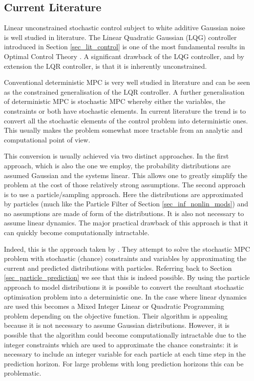\subsection{Current Literature}
Linear unconstrained stochastic control subject to white additive Gaussian noise is well studied in literature. The Linear Quadratic Gaussian (LQG) controller introduced in Section \ref{sec_lit_control} is one of the most fundamental results in Optimal Control Theory \cite{lqg}. A significant drawback of the LQG controller, and by extension the LQR controller, is that it is inherently unconstrained.

Conventional deterministic MPC is very well studied in literature \cite{raw} and can be seen as the constrained generalisation of the LQR controller. A further generalisation of deterministic MPC is stochastic MPC whereby either the variables, the constraints or both have stochastic elements. In current literature the trend is to convert all the stochastic elements of the control problem into deterministic ones. This usually makes the problem somewhat more tractable from an analytic and computational point of view.

This conversion is usually achieved via two distinct approaches. In the first approach, which is also the one we employ, the probability distributions are assumed Gaussian and the systems linear. This allows one to greatly simplify the problem at the cost of those relatively strong assumptions. The second approach is to use a particle/sampling approach. Here the distributions are approximated by particles (much like the Particle Filter of Section \ref{sec_inf_nonlin_mods}) and no assumptions are made of form of the distributions. It is also not necessary to assume linear dynamics. The major practical drawback of this approach is that it can quickly become computationally intractable.

Indeed, this is the approach taken by \cite{blackmore}. They attempt to solve the stochastic MPC problem with stochastic (chance) constraints and variables by approximating the current and predicted distributions with particles. Referring back to Section \ref{sec_particle_prediction} we see that this is indeed possible. By using the particle approach to model distributions it is possible to convert the resultant stochastic optimisation problem into a deterministic one. In the case where linear dynamics are used this becomes a Mixed Integer Linear or Quadratic Programming problem depending on the objective function. Their algorithm is appealing because it is not necessary to assume Gaussian distributions. However, it is possible that the algorithm could become computationally intractable due to the integer constraints which are used to approximate the chance constraints: it is necessary to include an integer variable for each particle at each time step in the prediction horizon. For large problems with long prediction horizons this can be problematic. 

